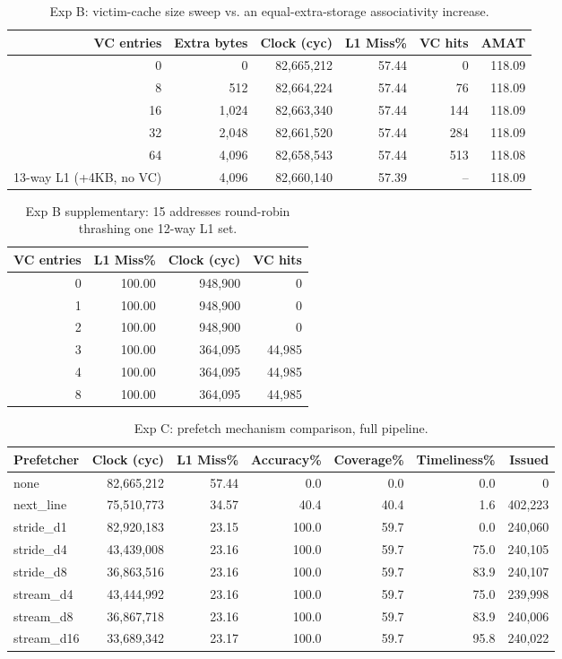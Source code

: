 \begin{table}[H]\centering\small
\begin{tabular}{rrrrrr}\toprule
VC entries & Extra bytes & Clock (cyc) & L1 Miss\% & VC hits & AMAT \\ \midrule
0 & 0 & 82,665,212 & 57.44 & 0 & 118.09 \\
8 & 512 & 82,664,224 & 57.44 & 76 & 118.09 \\
16 & 1,024 & 82,663,340 & 57.44 & 144 & 118.09 \\
32 & 2,048 & 82,661,520 & 57.44 & 284 & 118.09 \\
64 & 4,096 & 82,658,543 & 57.44 & 513 & 118.08 \\
\midrule 13-way L1 (+4KB, no VC) & 4{,}096 & 82,660,140 & 57.39 & -- & 118.09 \\
\bottomrule\end{tabular}
\caption{Exp B: victim-cache size sweep vs. an equal-extra-storage associativity increase.}
\label{tab:expB}\end{table}

\begin{table}[H]\centering\small
\begin{tabular}{rrrr}\toprule
VC entries & L1 Miss\% & Clock (cyc) & VC hits \\ \midrule
0 & 100.00 & 948,900 & 0 \\
1 & 100.00 & 948,900 & 0 \\
2 & 100.00 & 948,900 & 0 \\
3 & 100.00 & 364,095 & 44,985 \\
4 & 100.00 & 364,095 & 44,985 \\
8 & 100.00 & 364,095 & 44,985 \\
\bottomrule\end{tabular}
\caption{Exp B supplementary: 15 addresses round-robin thrashing one 12-way L1 set.}
\label{tab:expB-conflict}\end{table}

\begin{table}[H]\centering\small
\begin{tabular}{lrrrrrr}\toprule
Prefetcher & Clock (cyc) & L1 Miss\% & Accuracy\% & Coverage\% & Timeliness\% & Issued \\ \midrule
none & 82,665,212 & 57.44 & 0.0 & 0.0 & 0.0 & 0 \\
next\_line & 75,510,773 & 34.57 & 40.4 & 40.4 & 1.6 & 402,223 \\
stride\_d1 & 82,920,183 & 23.15 & 100.0 & 59.7 & 0.0 & 240,060 \\
stride\_d4 & 43,439,008 & 23.16 & 100.0 & 59.7 & 75.0 & 240,105 \\
stride\_d8 & 36,863,516 & 23.16 & 100.0 & 59.7 & 83.9 & 240,107 \\
stream\_d4 & 43,444,992 & 23.16 & 100.0 & 59.7 & 75.0 & 239,998 \\
stream\_d8 & 36,867,718 & 23.16 & 100.0 & 59.7 & 83.9 & 240,006 \\
stream\_d16 & 33,689,342 & 23.17 & 100.0 & 59.7 & 95.8 & 240,022 \\
\bottomrule\end{tabular}
\caption{Exp C: prefetch mechanism comparison, full pipeline.}
\label{tab:expC}\end{table}

